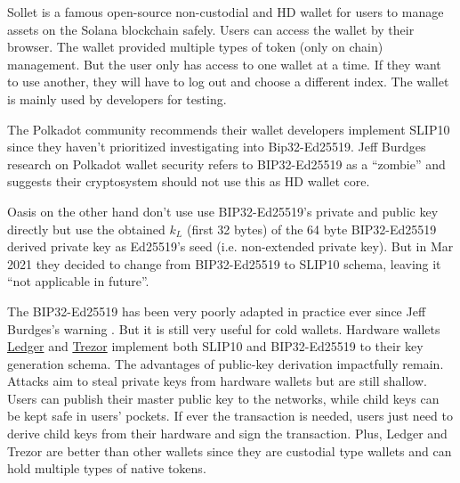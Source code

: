 Sollet \cite{sollet} is a famous open-source non-custodial and HD wallet for users to manage assets on the Solana blockchain safely. Users can access the wallet by their browser. The wallet provided multiple types of token (only on chain) management. But the user only has access to one wallet at a time. If they want to use another, they will have to log out and choose a different index. The wallet is mainly used by developers for testing.

The Polkadot community recommends their wallet developers implement SLIP10 since they haven’t prioritized investigating into Bip32-Ed25519. Jeff Burdges research on Polkadot wallet security refers to BIP32-Ed25519 as a “zombie” \cite{Jeff1} and suggests their cryptosystem should not use this as HD wallet core.

Oasis \cite{oasis} on the other hand don't use use BIP32-Ed25519's private and public key directly but use the obtained $k_L$ (first 32 bytes) of the 64 byte BIP32-Ed25519 derived private key as Ed25519's seed (i.e. non-extended private key). But in Mar 2021 they decided to change from BIP32-Ed25519 to SLIP10 schema, leaving it “not applicable in future”.

The BIP32-Ed25519 has been very poorly adapted in practice ever since Jeff Burdges's warning \cite{Jeff}. But it is still very useful for cold wallets. Hardware wallets \href{https://www.ledger.com/}{Ledger} and \href{https://trezor.io/}{Trezor} implement both SLIP10 and BIP32-Ed25519 to their key generation schema. The advantages of public-key derivation impactfully remain. Attacks aim to steal private keys from hardware wallets but are still shallow. Users can publish their master public key to the networks, while child keys can be kept safe in users' pockets. If ever the transaction is needed, users just need to derive child keys from their hardware and sign the transaction. Plus, Ledger and Trezor are better than other wallets since they are custodial type wallets and can hold multiple types of native tokens.

